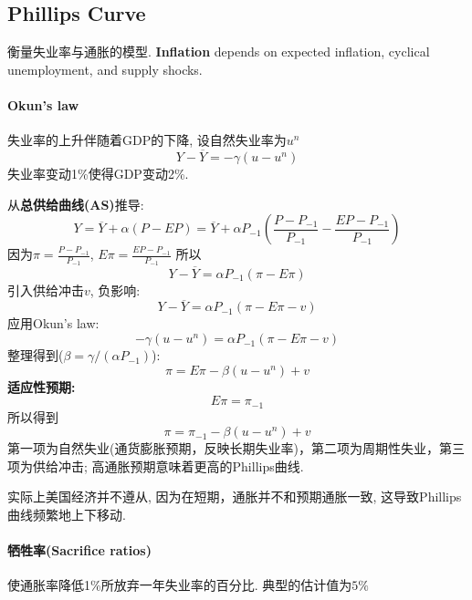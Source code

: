 \documentclass[UTF8, onecolumn, a4paper, 12pt]{article}
\begin{document}
\subsection{Phillips Curve}
衡量失业率与通胀的模型. \textbf{Inflation} depends on expected inflation, cyclical unemployment, and supply shocks.
\paragraph{Okun’s law} 失业率的上升伴随着GDP的下降, 设自然失业率为$u^n$
$$Y - \overline{Y} = -\gamma (u - u^n)$$
失业率变动1\%使得GDP变动2\%.

从\textbf{总供给曲线(AS)}推导:
$$Y = \overline{Y} + \alpha(P-EP) = \overline{Y} + \alpha P_{-1}(\frac{P-P_{-1}}{P_{-1}} - \frac{EP-P_{-1}}{P_{-1}})$$
因为$\pi = \frac{P-P_{-1}}{P_{-1}}$, $E\pi =\frac{EP-P_{-1}}{P_{-1}} $
所以
$$Y - \overline{Y} = \alpha P_{-1}(\pi - E\pi)$$
引入供给冲击$v$, 负影响:
$$Y - \overline{Y} = \alpha P_{-1}(\pi - E\pi - v)$$
应用Okun’s law:
$$-\gamma (u - u^n) = \alpha P_{-1}(\pi - E\pi - v)$$
整理得到($\beta = \gamma/(\alpha P_{-1})$):
$$\pi = E\pi - \beta(u - u^n) + v$$
\textbf{适应性预期:} $$E\pi = \pi_{-1}$$
所以得到
$$\pi = \pi_{-1} - \beta(u - u^n) + v$$
第一项为自然失业(通货膨胀预期，反映长期失业率)，第二项为周期性失业，第三项为供给冲击; 高通胀预期意味着更高的Phillips曲线. 

实际上美国经济并不遵从,  因为在短期，通胀并不和预期通胀一致,  这导致Phillips曲线频繁地上下移动.
\paragraph{牺牲率(Sacrifice ratios)}
使通胀率降低1\%所放弃一年失业率的百分比. 典型的估计值为$5\%$
\end{document}
